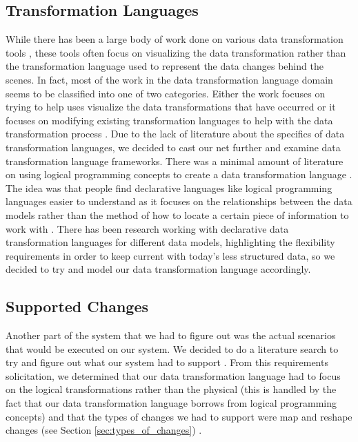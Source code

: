 \documentclass[12pt]{article}
\begin{document}
\subsection{Transformation Languages}
While there has been a large body of work done on various data transformation tools \cite{kandel2011wrangler, raman2001potter, kandel2012profiler}, these tools often focus on visualizing the data transformation rather than the transformation language used to represent the data changes behind the scenes. In fact, most of the work in the data transformation language domain seems to be classified into one of two categories. Either the work focuses on trying to help uses visualize the data transformations that have occurred \cite{kandel2011wrangler, raman2001potter, kandel2012profiler} or it focuses on modifying existing transformation languages to help with the data transformation process \cite{ilprints409, lakshmanan2001schemasql}. Due to the lack of literature about the specifics of data transformation languages, we decided to cast our net further and examine data transformation language frameworks. There was a minimal amount of literature on using logical programming concepts to create a data transformation language \cite{bry2002towards}. The idea was that people find declarative languages like logical programming languages easier to understand as it focuses on the relationships between the data models rather than the method of how to locate a certain piece of information to work with \cite{bry2002towards, tarau2009embedded}. There has been research working with declarative data transformation languages for different data models, highlighting the flexibility requirements in order to keep current with today's less structured data, \cite{bry2002towards, lawley2006practical, tarau2009embedded} so we decided to try and model our data transformation language accordingly.

\subsection{Supported Changes}
Another part of the system that we had to figure out was the actual scenarios that would be executed on our system. We decided to do a literature search to try and figure out what our system had to support \cite{galhardas:inria-00072476, kandel2011wrangler, kandel2012profiler,rahm2000data, raman2001potter}. From this requirements solicitation, we determined that our data transformation language had to focus on the logical transformations rather than the physical (this is handled by the fact that our data transformation language borrows from logical programming concepts) and that the types of changes we had to support were map and reshape changes (see Section \ref{sec:types_of_changes}) \cite{kandel2011wrangler}.
\end{document}
